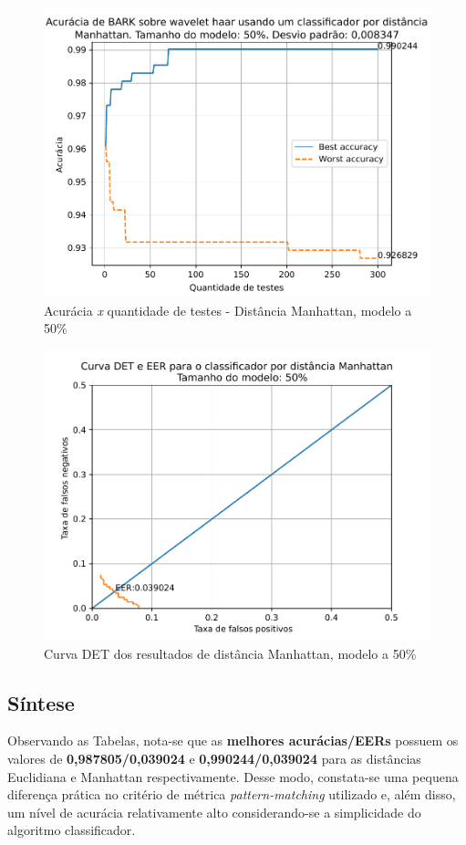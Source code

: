 			\begin{figure}[H]
				\centering
				\includegraphics[width=.9\linewidth]{images/results/confusionMatrices/classifier_Manhattan_50}
				\caption{Acurácia \textit{x} quantidade de testes - Distância Manhattan, modelo a 50\%}
				\label{fig:classifiermanhattan50}
			\end{figure}
	
			\begin{figure}[H]
				\centering
				\includegraphics[width=.9\linewidth]{images/results/det/DET_for_classifier_Manhattan_50}
				\caption{Curva DET dos resultados de distância Manhattan, modelo a 50\%}
				\label{fig:detforclassifiermanhattan50}
			\end{figure}

		\subsection{Síntese}
			\par Observando as Tabelas, nota-se que as \textbf{melhores acurácias/EERs} possuem os valores de \textbf{0,987805/0,039024} e \textbf{0,990244/0,039024} para as distâncias Euclidiana e Manhattan respectivamente. Desse modo, constata-se uma pequena diferença prática no critério de métrica \textit{pattern-matching} utilizado e, além disso, um nível de acurácia relativamente alto considerando-se a simplicidade do algoritmo classificador.

